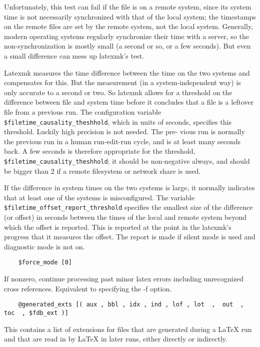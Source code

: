 Unfortunately, this test can fail if the file  is  on  a  remote system,  since
its  system time is not necessarily synchronized with that of the local system;
the  timestamps  on  the  remote files  are set by the remote system, not the
local system.  Generally, modern operating  systems  regularly  synchronize
their time  with  a server, so the non-synchronization is mostly small (a
second or so, or a few seconds).  But even a small difference can mess up
latexmk's test.

Latexmk measures the time difference between the time on the two systems and
compensates for this.  But  the  measurement  (in  a system-independent way) is
only accurate to a second or two.  So latexmk allows for a threshold on the
difference  between  file and  system  time  before it concludes that a file is
a leftover file from a previous  run.  The  configuration  variable
\verb|$filetime_causality_theshhold|,  which  in units of seconds, specifies
this threshold.  Luckily high precision is not needed.  The pre- vious  run  is
normally the previous run in a human run-edit-run cycle, and is at least many
seconds  back.   A  few  seconds  is therefore   appropriate  for  the
threshold,  \verb|$filetime_causality_theshhold|; it should be non-negative
always, and  should  be bigger than 2 if a remote filesystem or network share
is used.

If  the  difference in system times on the two systems is large, it normally
indicates that at least one of the systems  is  misconfigured.    The
variable  \verb|$filetime_offset_report_threshold| specifies the smallest size of the
difference  (or  offset)  in seconds  between the times of the local and remote
system beyond which the offset is reported.  This is reported at the point  in
the  latexmk's  progress that it measures the offset. The report is made if
silent mode is used and diagnostic mode is not on.


\begin{verbatim}
	$force_mode [0]
\end{verbatim}

If nonzero, continue processing past minor latex errors  including unrecognized
cross references.  Equivalent to specifying the -f option.

\begin{verbatim}
	@generated_exts [( aux , bbl , idx , ind , lof , lot  ,  out  ,  toc  , $fdb_ext )]
\end{verbatim}

This  contains a list of extensions for files that are generated
during a LaTeX run and that are read in by LaTeX in later  runs,
either directly or indirectly.

